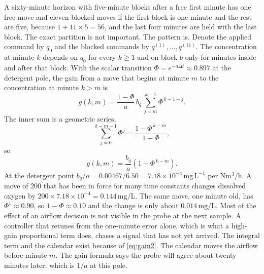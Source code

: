 A sixty-minute horizon with five-minute blocks after a free first minute has one free move and eleven blocked moves if the first block is one minute and the rest are five, because $1+11\times 5=56$, and the last four minutes are held with the last block. The exact partition is not important. The pattern is. Denote the applied command by $q_{0}$ and the blocked commands by $q^{(1)},\ldots,q^{(11)}$. The concentration at minute $k$ depends on $q_{0}$ for every $k\ge 1$ and on block $b$ only for minutes inside and after that block. With the scalar transition $\Phi=e^{-a\Delta t}\approx 0.897$ at the detergent pole, the gain from a move that begins at minute $m$ to the concentration at minute $k>m$ is
\begin{equation}
\label{eq:gain}
g(k,m)
=
\frac{1-\Phi}{a}\,
b_{q}\,
\sum_{j=m}^{k-1}
\Phi^{\,k-1-j}.
\end{equation}
The inner sum is a geometric series,
\begin{equation}
\sum_{j=0}^{k-m-1}\Phi^{j}
=
\frac{1-\Phi^{\,k-m}}{1-\Phi},
\end{equation}
so
\begin{equation}
\label{eq:gain2}
g(k,m)
=
\frac{b_{q}}{a}
\left(
1-\Phi^{\,k-m}
\right).
\end{equation}
At the detergent point $b_{q}/a=0.00467/6.50=7.18\times 10^{-4}\,\mathrm{mg\,L^{-1}}$ per $\mathrm{Nm^{3}/h}$. A move of \SI{200}{\nmcph} that has been in force for many time constants changes dissolved oxygen by $200\times 7.18\times 10^{-4}=0.144\,\mathrm{mg/L}$. The same move, one minute old, has $\Phi^{1}\approx 0.90$, so $1-\Phi\approx 0.10$ and the change is only about $0.014\,\mathrm{mg/L}$. Most of the effect of an airflow decision is not visible in the probe at the next sample. A controller that retunes from the one-minute error alone, which is what a high-gain proportional term does, chases a signal that has not yet arrived. The integral term and the calendar exist because of \eqref{eq:gain2}. The calendar moves the airflow before minute $m$. The gain formula says the probe will agree about twenty minutes later, which is $1/a$ at this pole.

